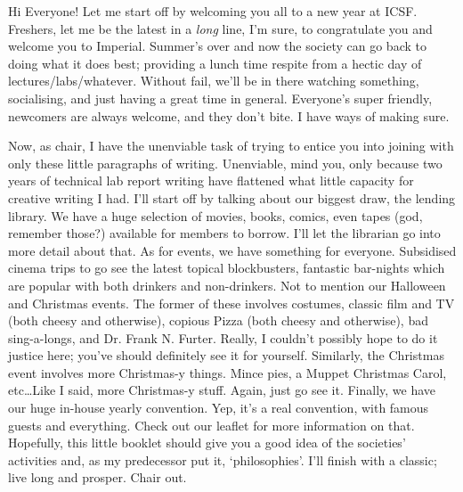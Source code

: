 Hi Everyone! 
Let me start off by welcoming you all to a new year at ICSF. Freshers, let me be the latest in a \textit{long} line, I’m sure, to congratulate you and welcome you to Imperial. Summer’s over and now the society can go back to doing what it does best; providing a lunch time respite from a hectic day of lectures/labs/whatever. Without fail, we’ll be in there watching something, socialising, and just having a great time in general. Everyone’s super friendly, newcomers are always welcome, and they don’t bite. I have ways of making sure.

 Now, as chair, I have the unenviable task of trying to entice you into joining with only these little paragraphs of writing. Unenviable, mind you, only because two years of technical lab report writing have flattened what little capacity for creative writing I had. I’ll start off by talking about our biggest draw, the lending library. We have a huge selection of movies, books, comics, even tapes (god, remember those?) available for members to borrow. I’ll let the librarian go into more detail about that. As for events, we have something for everyone. Subsidised cinema trips to go see the latest topical blockbusters, fantastic bar-nights which are popular with both drinkers and non-drinkers. Not to mention our Halloween and Christmas events. The former of these involves costumes, classic film and TV (both cheesy and otherwise), copious Pizza (both cheesy and otherwise), bad sing-a-longs, and Dr. Frank N. Furter. Really, I couldn’t possibly hope to do it justice here; you’ve should definitely see it for yourself. Similarly, the Christmas event involves more Christmas-y things. Mince pies, a Muppet Christmas Carol, etc…Like I said, more Christmas-y stuff. Again, just go see it. Finally, we have our huge in-house yearly convention. Yep, it’s a real convention, with famous guests and everything. Check out our leaflet for more information on that. Hopefully, this little booklet should give you a good idea of the societies’ activities and, as my predecessor put it, ‘philosophies’. I’ll finish with a classic; live long and prosper. Chair out.
